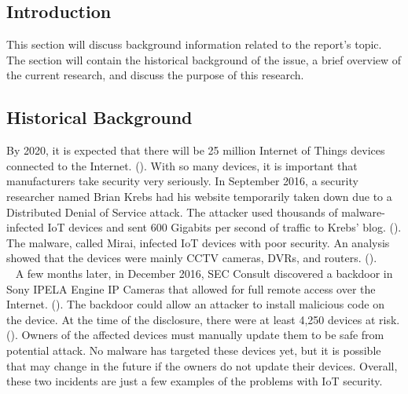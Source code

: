 \documentclass[letterpaper, 12pt]{article}
\begin{document}
\begin{flushleft}
\section*{Introduction}
This section will discuss background information related to the report's topic. The section will contain the historical background of the issue, a brief
overview of the current research, and discuss the purpose of this research.

\subsection*{Historical Background}
By 2020, it is expected that there will be 
25 million Internet of Things devices connected to the Internet. (\cite{Martinez1}). With so many devices, it is important that manufacturers take security very seriously. 
In September 2016, a security researcher named Brian Krebs had his website temporarily taken down due to a Distributed Denial of Service attack. The attacker
used thousands of malware-infected IoT devices and sent 600 Gigabits per second of traffic to Krebs' blog. (\cite{Krebs}). The malware, called Mirai, 
infected IoT devices with poor security. An analysis showed that the devices were mainly CCTV cameras, DVRs, and routers. (\cite{Incapsula}).\\
~\newline
A few months later, in December 2016, SEC Consult discovered a backdoor in Sony IPELA Engine IP Cameras that allowed for full remote access over the Internet. (\cite{sec}). The backdoor could allow an attacker
to install malicious code on the device. At the time of the disclosure, there were at least 4,250 devices at risk. (\cite{Krebs2}). Owners of the affected devices must manually update them
to be safe from potential attack. No malware has targeted these devices yet, but it is possible that may change in the future if the owners do not update their devices. Overall, these two incidents
are just a few examples of the problems with IoT security.


\end{flushleft}
\end{document}
